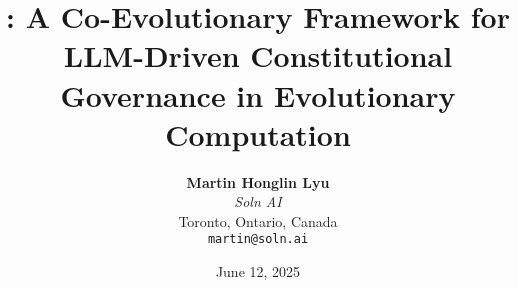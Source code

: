 




\title{\textbf{\acgs{}: A Co-Evolutionary Framework for LLM-Driven Constitutional Governance in Evolutionary Computation}}

\author{
    \textbf{Martin Honglin Lyu}\\
    \textit{Soln AI}\\
    Toronto, Ontario, Canada\\
    \texttt{martin@soln.ai}
}

\date{June 12, 2025}

\maketitle

